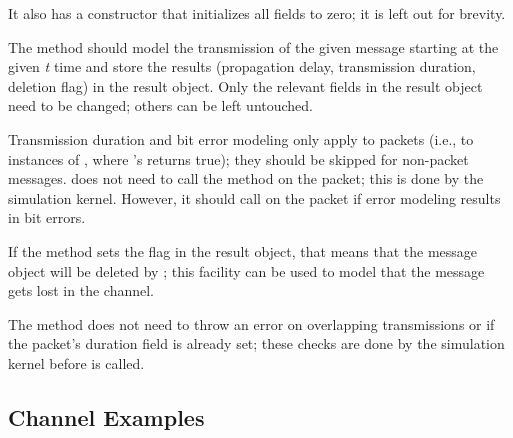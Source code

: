 It also has a constructor that initializes all fields to zero; it is left
out for brevity.

The method should model the transmission of the given message starting at
the given \textit{t} time and store the results (propagation delay,
transmission duration, deletion flag) in the result object. Only the
relevant fields in the result object need to be changed; others can be left
untouched.

Transmission duration and bit error modeling only apply to packets (i.e.,
to instances of , where 's
 returns true); they should be skipped for non-packet
messages.  does not need to call the 
method on the packet; this is done by the simulation kernel. However,
it should call  on the packet
if error modeling results in bit errors.

If the method sets the  flag in the result object, that
means that the message object will be deleted by {\opp}; this facility
can be used to model that the message gets lost in the channel.

The  method does not need to throw an error on overlapping
transmissions or if the packet's duration field is already set; these
checks are done by the simulation kernel before  is called.

%
%
%


\subsection{Channel Examples}
\label{sec:simple-modules:channel-examples}

